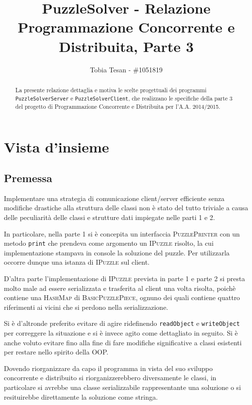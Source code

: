 \documentclass[a4paper]{article}
\title{PuzzleSolver - Relazione Programmazione Concorrente e Distribuita, Parte 3}
\author{Tobia Tesan - \#1051819}
\newcommand{\Classname}[1]{\textsc{#1}}
\newcommand{\Ifacename}[1]{\textsc{#1}}
\newcommand{\Methodname}[1]{\texttt{#1}}
\begin{document}
\maketitle

\begin{abstract}
La presente relazione dettaglia e motiva le scelte progettuali dei programmi \texttt{PuzzleSolverServer} e \texttt{PuzzleSolverClient}, che realizzano le specifiche della parte 3 del progetto di Programmazione Concorrente e Distribuita per l'A.A. 2014/2015.
\end{abstract}

\tableofcontents

\section{Vista d'insieme}
\subsection{Premessa}
Implementare una strategia di comunicazione client/server efficiente senza modifiche drastiche alla struttura delle classi non \`e stato del tutto triviale a causa delle peculiarit\`a delle classi e strutture dati impiegate nelle parti 1 e 2.

In particolare, nella parte 1 si \`e concepita un interfaccia \Ifacename{PuzzlePrinter} con un metodo \Methodname{print} che prendeva come argomento un \Ifacename{IPuzzle} risolto, la cui implementazione stampava in console la soluzione del puzzle.
Per utilizzarla occorre dunque una istanza di \Ifacename{IPuzzle} sul client.

D'altra parte l'implementazione di \Ifacename{IPuzzle} prevista in parte 1 e parte 2 si presta molto male ad essere serializzata e trasferita al client una volta risolta, poich\`e contiene una \Classname{HashMap} di \Classname{BasicPuzzlePiece}, ognuno dei quali contiene quattro riferimenti ai vicini che si perdono nella serializzazione.
\label{intro}

Si \`e d'altronde preferito evitare di agire ridefinendo \Methodname{readObject} e \Methodname{writeObject} per correggere la situazione e si \`e invece agito come dettagliato in seguito.
Si \`e anche voluto evitare fino alla fine di fare modifiche significative a classi esistenti per restare nello spirito della OOP.


Dovendo riorganizzare da capo il programma in vista del suo sviluppo concorrente e distribuito si riorganizzerebbero diversamente le classi, in particolare si avrebbe una classe serializzabile rappresentante una soluzione o si resituirebbe direttamente la soluzione come stringa.
\end{document}
